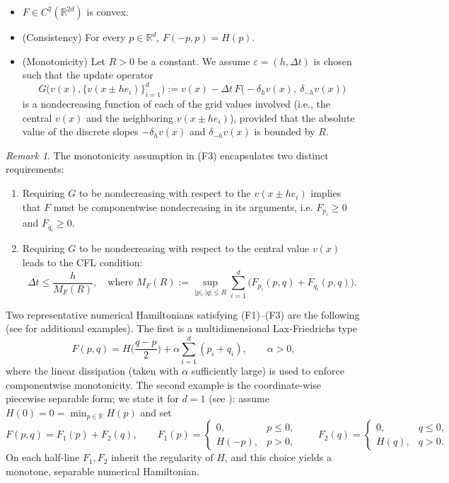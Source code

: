 \documentclass[11pt]{amsart}
\theoremstyle{remark}
\newtheorem{rem}[thm]{Remark}
\theoremstyle{definition}
\theoremstyle{Claim}
\theoremstyle{plain}
\begin{document}
\begin{itemize}
    \item[(F1)] \(F\in C^2(\mathbb{R}^{2d})\) is convex.  
    \item[(F2)] (Consistency) For every \(p\in\mathbb{R}^d\),
       $ F(-p,p)=H(p).$
    \item[(F3)] (Monotonicity) Let $R>0$ be a constant. We assume $\varepsilon=(h,\Delta t)$ is chosen such that the update operator
    \[
       G\big(v(x), \{v(x \pm h e_i)\}_{i=1}^d\big):= v(x) - \Delta t\, F\big(-\delta_{h} v(x),\ \delta_{-h} v(x)\big)
    \]
    is a nondecreasing function of each of the grid values involved (i.e., the central $v(x)$ and the neighboring $v(x \pm h e_i)$), provided that the absolute value of the discrete slopes $-\delta_{h} v(x)$ and $\delta_{-h} v(x)$ is bounded by $R$.
\end{itemize}
\begin{rem}
    The monotonicity assumption in (F3) encapsulates two distinct requirements:
    \begin{enumerate}
        \item Requiring $G$ to be nondecreasing with respect to the $v(x\pm h e_i)$ implies that $F$ must be componentwise nondecreasing in its arguments, i.e. $F_{p_i} \ge 0$ and $F_{q_i} \ge 0$.
        \item Requiring $G$ to be nondecreasing with respect to the central value $v(x)$ leads to the CFL condition:
        \[
            \Delta t \le \frac{h}{M_F(R)}, \quad \text{where } M_F(R) := \sup_{|p|,|q|\le R} \sum_{i=1}^d \big( F_{p_i}(p,q)+F_{q_i}(p,q) \big).
        \]
    \end{enumerate}
\end{rem}
Two representative numerical Hamiltonians satisfying (F1)--(F3) are the following (see \cite{cl} for additional examples). The first is a multidimensional Lax-Friedrichs type
\[
F(p,q)=H\!\Big(\frac{q-p}{2}\Big)+\alpha\sum_{i=1}^d (p_i+q_i),
\qquad \alpha>0,
\]
where the linear dissipation (taken with \(\alpha\) sufficiently large) is used to enforce componentwise monotonicity. The second example is the coordinate-wise piecewise separable form; we state it for \(d=1\) (see \cite{cgt}): assume \(H(0)=0=\min_{p\in\mathbb{R}}H(p)\) and set
\[
F(p,q)=F_1(p)+F_2(q),\qquad
F_1(p)=\begin{cases}0,&p\le0,\\[2pt]H(-p),&p>0,\end{cases}\qquad
F_2(q)=\begin{cases}0,&q\le0,\\[2pt]H(q),&q>0.\end{cases}
\]
On each half-line \(F_1,F_2\) inherit the regularity of \(H\), and this choice yields a monotone, separable numerical Hamiltonian. 
\end{document}
